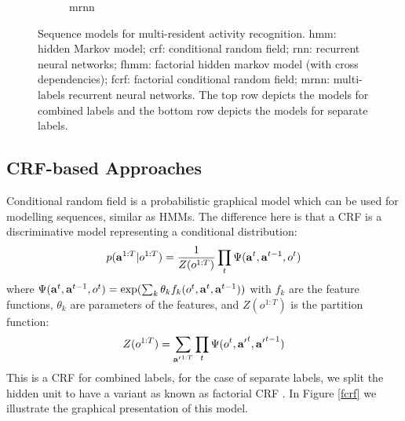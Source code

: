 \begin{figure}[ht]
\begin{subfigure}{0.32\textwidth}
    \caption{mrnn}
    \label{mrnn}
  \end{subfigure}
  \caption{Sequence models for multi-resident activity recognition. hmm: hidden Markov model; crf: conditional random field; rnn: recurrent neural networks; fhmm: factorial hidden markov model (with cross dependencies); fcrf: factorial conditional random field; mrnn: multi-labels recurrent neural networks. The top row depicts the models for combined labels and the bottom row depicts the models for separate labels.}
\end{figure}
\subsection{CRF-based Approaches}
Conditional random field is a probabilistic graphical model which can be used for modelling sequences, similar as HMMs. The difference here is that a CRF is a discriminative model representing a conditional distribution:
\begin{equation}
    p(\mathbf{a}^{1:T}|o^{1:T}) = \frac{1}{Z(o^{1:T})}\prod_{t}\Psi(\mathbf{a}^t,\mathbf{a}^{t-1},o^t)
\end{equation}
where $\Psi(\mathbf{a}^t,\mathbf{a}^{t-1},o^t) = \exp(\sum_k \theta_k
f_k(o^t,\mathbf{a}^t,\mathbf{a}^{t-1}))$ with $f_k$ are the feature functions,
$\theta_k$ are parameters of the features, and $Z(o^{1:T})$ is the
partition function:
\begin{equation}
Z(o^{1:T}) = \sum_{{\mathbf{a}'}^{1:T}} \prod_{t}\Psi(o^t,{\mathbf{a}'}^t,{\mathbf{a}'}^{t-1})
\end{equation}
This is a CRF for combined labels, for the case of separate labels, we
split the hidden unit to have a variant as known as factorial CRF
\cite{Sutton_2007}. In Figure \ref{fcrf} we illustrate the graphical
presentation of this model.
